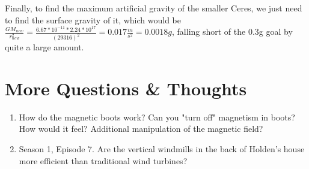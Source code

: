 \documentclass{amsart}
\theoremstyle{definition}
\begin{document}
Finally, to find the maximum artificial gravity of the smaller Ceres, we just need to find the surface gravity of it, which would be \(\frac{GM_{new}}{r_{new}^2}=\frac{6.67*10^{-11}*2.24*10^{17}}{(29316)^2} = 0.017\frac{m}{s^2} = 0.0018g\), falling short of the 0.3g goal by quite a large amount.









\section{More Questions \& Thoughts}
\begin{enumerate}
    \item How do the magnetic boots work? Can you "turn off" magnetism in boots?
    \subitem How would it feel? Additional manipulation of the magnetic field?
    
    \item Season 1, Episode 7. Are the vertical windmills in the back of Holden's house more efficient than traditional wind turbines?
    

\end{enumerate}
\end{document}
